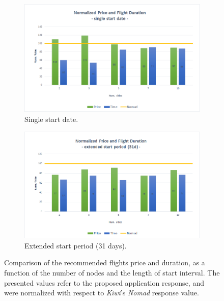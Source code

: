 \begin{figure}[h!]
\centering
    \begin{subfigure}[a]{0.5\textwidth}
      \includegraphics[width=1\linewidth]{./imgs/normalized_results_ss.png}
      \caption{Single start date.}
      \label{fig:comparison_a} 
    \end{subfigure}
    \begin{subfigure}[b]{0.5\textwidth}
      \includegraphics[width=1\linewidth]{./imgs/normalized_results_es.png}
      \caption{Extended start period (31 days).}
      \label{fig:comparison_b}
    \end{subfigure}
 \caption{Comparison of the recommended flights price and duration, as a function of the number of nodes and the length of start interval. The presented values refer to the proposed application response, and were normalized with respect to \textit{Kiwi}'s \textit{Nomad} response value.}
 \label{fig:comparison}
\end{figure}

